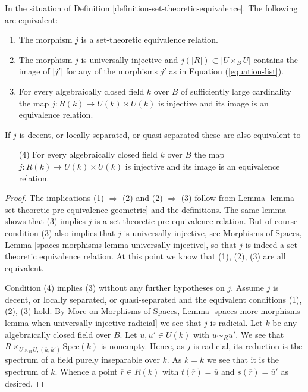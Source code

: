 \begin{lemma}
\label{lemma-set-theoretic-equivalence-geometric}
In the situation of Definition \ref{definition-set-theoretic-equivalence}.
The following are equivalent:
\begin{enumerate}
\item The morphism $j$ is a set-theoretic equivalence relation.
\item The morphism $j$ is universally injective and
$j(|R|) \subset |U \times_B U|$ contains the image of
$|j'|$ for any of the morphisms $j'$ as in Equation (\ref{equation-list}).
\item For every algebraically closed field $k$ over $B$ of sufficiently large
cardinality the map $j : R(k) \to U(k) \times U(k)$ is injective and
its image is an equivalence relation.
\end{enumerate}
If $j$ is decent, or locally separated, or quasi-separated
these are also equivalent to
\begin{enumerate}
\item[(4)] For every algebraically closed field $k$ over $B$
the map $j : R(k) \to U(k) \times U(k)$ is injective and its image
is an equivalence relation.
\end{enumerate}
\end{lemma}

\begin{proof}
The implications (1) $\Rightarrow$ (2) and (2) $\Rightarrow$ (3) follow from
Lemma \ref{lemma-set-theoretic-pre-equivalence-geometric}
and the definitions. The same lemma shows that (3) implies
$j$ is a set-theoretic pre-equivalence relation. But of course condition
(3) also implies that $j$ is universally injective, see
Morphisms of Spaces, Lemma \ref{spaces-morphisms-lemma-universally-injective},
so that $j$ is indeed a set-theoretic equivalence relation.
At this point we know that (1), (2), (3) are all equivalent.

\medskip\noindent
Condition (4) implies (3) without any further hypotheses on $j$. Assume $j$
is decent, or locally separated, or quasi-separated and the equivalent
conditions (1), (2), (3) hold. By
More on Morphisms of Spaces,
Lemma \ref{spaces-more-morphisms-lemma-when-universally-injective-radicial}
we see that $j$ is radicial.
Let $k$ be any algebraically closed field over $B$. Let
$\overline{u}, \overline{u}' \in U(k)$ with
$\overline{u} \sim_R \overline{u}'$. We see that
$R \times_{U \times_B U, (\overline{u}, \overline{u}')} \text{Spec}(k)$
is nonempty. Hence, as $j$ is radicial, its reduction is the spectrum of a
field purely inseparable over $k$. As $k = \overline{k}$ we see that
it is the spectrum of $k$. Whence a point $\overline{r} \in R(k)$
with $t(\overline{r}) = \overline{u}$ and $s(\overline{r}) = \overline{u}'$
as desired.
\end{proof}

